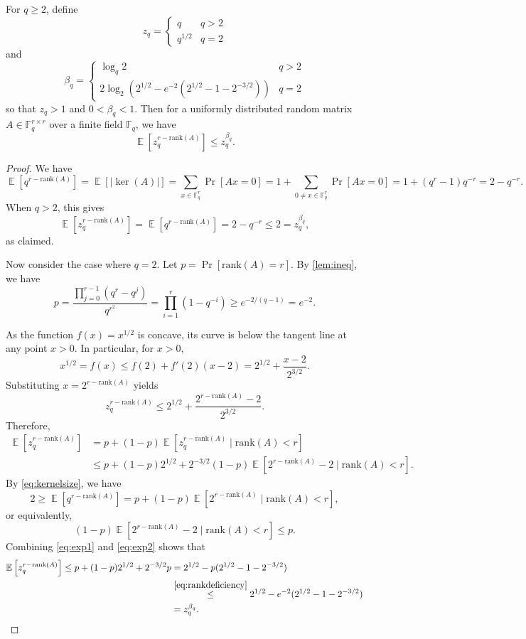 \documentclass[11pt]{article}
\newcommand{\ex}{\mathop{{}\mathbb{E}}}
\newcommand{\rank}{\mathrm{rank}}
\newcommand{\F}{\mathbb{F}}
\begin{document}
\begin{lemma}\label{lem:expbound}
For $q\geq 2$, define
\[
z_q=\begin{cases}
q & q>2\\
q^{1/2} & q=2
\end{cases}
\]
and
\[
\beta_q=\begin{cases}
\log_q 2 & q>2\\
2\log_{2}(2^{1/2}-e^{-2}(2^{1/2}-1-2^{-3/2})) & q=2
\end{cases}
\]
so that $z_q>1$ and $0<\beta_q<1$.
Then for a uniformly distributed random matrix $A\in\F_q^{r\times r}$ over a finite field $\F_q$, we have 
\[
\ex\left[z_q^{r-\rank(A)}\right]\leq z_q^{\beta_q}.
\]
\end{lemma}
\begin{proof}
We have
\begin{equation}\label{eq:kernelsize}
\ex\left[q^{r-\rank(A)}\right]
=\ex\left[|\ker(A)|\right]
=\sum_{x\in \F_q^r} \Pr[Ax=0]
=1+\sum_{0\neq x\in \F_q^r} \Pr[Ax=0]
=1+(q^r-1)q^{-r}=2-q^{-r}.
\end{equation}
When $q>2$, this gives
\[
\ex\left[z_q^{r-\rank(A)}\right]
=\ex\left[q^{r-\rank(A)}\right]=2-q^{-r}\leq 2=z_q^{\beta_q},
\]
as claimed.

Now consider the case where $q=2$. 
Let $p=\Pr[\rank(A)=r]$.
By \cref{lem:ineq}, we have
\begin{equation}\label{eq:rankdeficiency}
p=\frac{\prod_{j=0}^{r-1}(q^r-q^j)}{q^{r^2}}
=\prod_{i=1}^r(1-q^{-i})
\geq e^{-2/(q-1)}=e^{-2}.
\end{equation}

As the function $f(x)=x^{1/2}$ is concave, its curve is below the tangent line at any point $x>0$.
In particular, for $x>0$,
\[
x^{1/2}=f(x)\leq f(2)+f'(2)(x-2)=2^{1/2}+\frac{x-2}{2^{3/2}}.
\]
Substituting $x=2^{r-\rank(A)}$ yields
\[
z_q^{r-\rank(A)}\leq 2^{1/2}+\frac{2^{r-\rank(A)}-2}{2^{3/2}}.
\]
Therefore,
\begin{equation}\label{eq:exp1}
\begin{aligned}
\ex\left[z_q^{r-\rank(A)}\right]
&=p+(1-p)\ex\left[z_q^{r-\rank(A)}\mid \rank(A)<r\right]\\
&\leq p+(1-p)2^{1/2}+2^{-3/2}(1-p)\ex\left[2^{r-\rank(A)}-2\mid \rank(A)<r\right].
\end{aligned}
\end{equation}
By \eqref{eq:kernelsize}, we have
\[
2\geq \ex\left[q^{r-\rank(A)}\right]=p+(1-p)\ex\left[2^{r-\rank(A)}\mid \rank(A)<r\right],
\]
or equivalently,
\begin{equation}\label{eq:exp2}
(1-p)\ex\left[2^{r-\rank(A)}-2\mid \rank(A)<r\right]\leq p.
\end{equation}
Combining \eqref{eq:exp1} and \eqref{eq:exp2} shows that
\begin{align*}
\ex\left[z_q^{r-\rank(A)}\right]
\leq p+(1-p)2^{1/2}+2^{-3/2}p
&=2^{1/2}-p(2^{1/2}-1-2^{-3/2})\\
&\stackrel{\eqref{eq:rankdeficiency}}{\leq} 2^{1/2}-e^{-2}(2^{1/2}-1-2^{-3/2})\\
&= z_q^{\beta_q}.\qedhere
\end{align*}


\end{proof}
\end{document}
